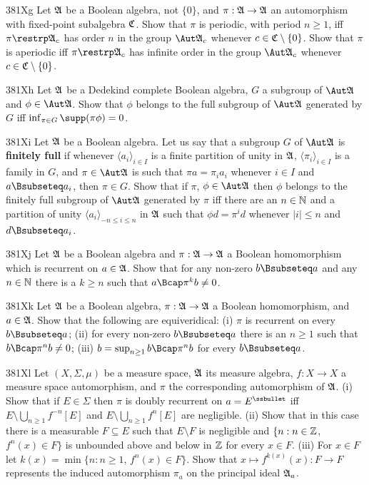{\spheader 381Xg %
Let $\frak A$ be a Boolean algebra,
not $\{0\}$, and $\pi:\frak A\to\frak A$ an automorphism with
fixed-point subalgebra $\frak C$.   Show that
$\pi$ is periodic, with period $n\ge 1$, iff $\pi\restrp\frak A_c$ has
order $n$ in the group $\Aut\frak A_c$ whenever
$c\in\frak C\setminus\{0\}$.
Show that $\pi$ is aperiodic iff $\pi\restrp\frak A_c$
has infinite order in the group $\Aut\frak A_c$ whenever
$c\in\frak C\setminus\{0\}$.

\spheader 381Xh
Let $\frak A$ be a Dedekind complete Boolean algebra,
$G$ a subgroup of $\Aut\frak A$ and $\phi\in\Aut\frak A$.   Show that
$\phi$ belongs to the full subgroup of $\Aut\frak A$ generated by $G$ iff
$\inf_{\pi\in G}\supp(\pi\phi)=0$.

\spheader 381Xi Let $\frak A$ be a Boolean algebra.   Let us say that a
subgroup $G$ of $\Aut\frak A$ is {\bf finitely full} if whenever
$\langle a_i\rangle_{i\in I}$ is a finite partition of
unity in $\frak A$, $\langle\pi_i\rangle_{i\in I}$ is a family in
$G$, and $\pi\in\Aut\frak A$ is such that $\pi a=\pi_ia_i$ whenever
$i\in I$ and $a\Bsubseteq a_i$, then $\pi\in G$.   Show that if $\pi$,
$\phi\in\Aut\frak A$ then $\phi$ belongs to the finitely full subgroup
of $\Aut\frak A$ generated by $\pi$ iff there are an $n\in\Bbb N$ and a
partition of unity $\langle a_i\rangle_{-n\le i\le n}$ in $\frak A$ such
that $\phi d=\pi^id$ whenever $|i|\le n$ and $d\Bsubseteq a_i$.

\spheader 381Xj Let $\frak A$ be a Boolean algebra and
$\pi:\frak A\to\frak A$ a Boolean homomorphism which is recurrent on
$a\in\frak A$.   Show that for any non-zero $b\Bsubseteq a$ and any
$n\in\Bbb N$ there is a $k\ge n$ such that $a\Bcap\pi^kb\ne 0$.

\spheader 381Xk Let $\frak A$ be a Boolean algebra,
$\pi:\frak A\to\frak A$ a Boolean homomorphism, and $a\in\frak A$.
Show that the following are equiveridical:  (i) $\pi$ is recurrent on
every $b\Bsubseteq a$;
(ii) for every non-zero $b\Bsubseteq a$ there is an $n\ge 1$ such that
$b\Bcap\pi^nb\ne 0$;  (iii) $b=\sup_{n\ge 1}b\Bcap\pi^nb$ for every
$b\Bsubseteq a$.

\sqheader 381Xl Let $(X,\Sigma,\mu)$ be a measure space, $\frak A$ its
measure algebra, $f:X\to X$ a measure space automorphism, and
$\pi$ the corresponding automorphism of $\frak A$.   (i) Show that if
$E\in\Sigma$ then $\pi$ is doubly recurrent on $a=E^{\ssbullet}$ iff
$E\setminus\bigcup_{n\ge 1}f^{-n}[E]$ and
$E\setminus\bigcup_{n\ge 1}f^n[E]$ are negligible.   (ii) Show that in
this case there is a measurable $F\subseteq E$ such that $E\setminus F$
is negligible and $\{n:n\in\Bbb Z$, $f^n(x)\in F\}$ is unbounded above
and below in $\Bbb Z$ for every $x\in F$.   (iii) For $x\in F$ let
$k(x)=\min\{n:n\ge 1$, $f^n(x)\in F\}$.   Show that
$x\mapsto f^{k(x)}(x):F\to F$ represents the induced automorphism
$\pi_a$ on the principal ideal $\frak A_a$.

}
